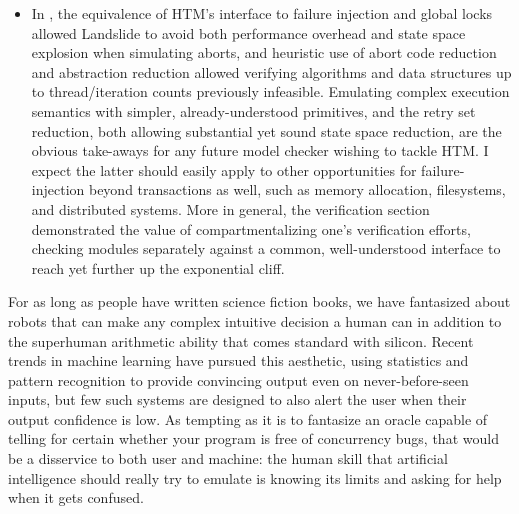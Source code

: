 \documentclass[12pt]{cmuthesis}
\begin{document}
{\begin{itemize}
	\item In ,
		the equivalence of HTM's interface to failure injection and global locks
		allowed Landslide to avoid both performance overhead and state space explosion when simulating aborts,
		and heuristic use of abort code reduction and abstraction reduction
		allowed verifying algorithms and data structures up to thread/iteration counts previously infeasible.
		Emulating complex execution semantics with simpler, already-understood primitives,
		and the retry set reduction,
		both allowing substantial yet sound state space reduction,
		are the obvious take-aways for any future model checker wishing to tackle HTM.
		I expect the latter should easily apply to other opportunities for failure-injection beyond transactions as well,
		such as memory allocation, filesystems, and distributed systems.
		More in general,
		the verification section demonstrated the value of compartmentalizing one's verification efforts,
		checking modules separately against a common, well-understood interface
		to reach yet further up the exponential cliff.
\end{itemize}
}

For as long as people have written science fiction books,
we have fantasized about robots that can make any complex intuitive decision a human can
in addition to the superhuman arithmetic ability that comes standard with silicon.
Recent trends in machine learning have pursued this aesthetic,
using statistics and pattern recognition to provide convincing output even on never-before-seen inputs,
but few such systems are designed to also alert the user when their output confidence is low.
As tempting as it is to fantasize an oracle capable of telling for certain whether your program is free of concurrency bugs,
that would be a disservice to both user and machine:
the human skill that artificial intelligence should really try to emulate is
knowing its limits and asking for help when it gets confused.
\end{document}
